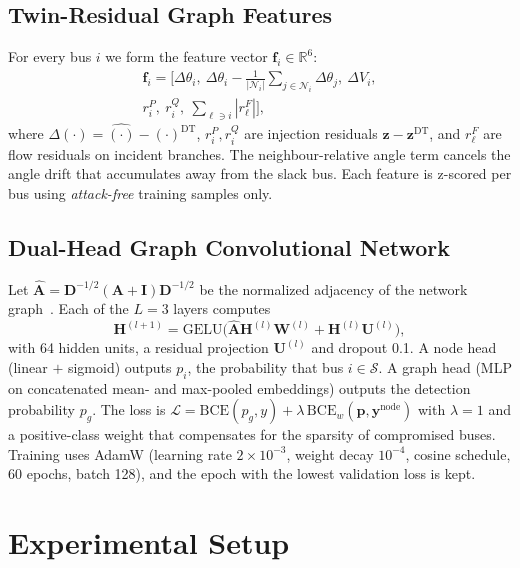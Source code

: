 \subsection{Twin-Residual Graph Features}
For every bus $i$ we form the feature vector $\mathbf{f}_i\in\mathbb{R}^6$:
\begin{multline}
\mathbf{f}_i=\big[\Delta\theta_i,\ \Delta\theta_i-\tfrac{1}{|\mathcal{N}_i|}\textstyle\sum_{j\in\mathcal{N}_i}\Delta\theta_j,\ \Delta V_i,\\
 r^{P}_i,\ r^{Q}_i,\ \textstyle\sum_{\ell\ni i}|r^{F}_\ell|\big],
\end{multline}
where $\Delta(\cdot)=\hat{(\cdot)}-(\cdot)^{\mathrm{DT}}$, $r^{P}_i,r^{Q}_i$ are injection residuals $\mathbf{z}-\mathbf{z}^{\mathrm{DT}}$, and $r^F_\ell$ are flow residuals on incident branches. The neighbour-relative angle term cancels the angle drift that accumulates away from the slack bus. Each feature is z-scored per bus using \emph{attack-free} training samples only.

\subsection{Dual-Head Graph Convolutional Network}
Let $\hat{\mathbf{A}}=\mathbf{D}^{-1/2}(\mathbf{A}+\mathbf{I})\mathbf{D}^{-1/2}$ be the normalized adjacency of the network graph~\cite{kipf2017gcn}. Each of the $L=3$ layers computes
\begin{equation}
\mathbf{H}^{(l+1)}=\mathrm{GELU}\big(\hat{\mathbf{A}}\mathbf{H}^{(l)}\mathbf{W}^{(l)}+\mathbf{H}^{(l)}\mathbf{U}^{(l)}\big),
\end{equation}
with 64 hidden units, a residual projection $\mathbf{U}^{(l)}$ and dropout 0.1. A node head (linear $+$ sigmoid) outputs $p_i$, the probability that bus $i\in\mathcal{S}$. A graph head (MLP on concatenated mean- and max-pooled embeddings) outputs the detection probability $p_g$. The loss is $\mathcal{L}=\mathrm{BCE}(p_g,y)+\lambda\,\mathrm{BCE}_{w}(\mathbf{p},\mathbf{y}^{\text{node}})$ with $\lambda=1$ and a positive-class weight that compensates for the sparsity of compromised buses. Training uses AdamW (learning rate $2\times10^{-3}$, weight decay $10^{-4}$, cosine schedule, 60 epochs, batch 128), and the epoch with the lowest validation loss is kept.

\section{Experimental Setup}
